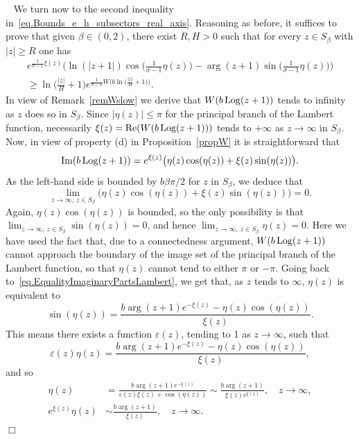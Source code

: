 \documentclass[12pt,leqno]{amsart}
\theoremstyle{plain}
\theoremstyle{definition}
\numberwithin{equation}{section}
\def\Log{\mathop{\rm Log}\nolimits}
\def\Re{\mathop{\rm Re}\nolimits}      %
\def\Im{\mathop{\rm Im}\nolimits}
\newenvironment{proof1}{\medskip\par\noindent{\bf Proof}\ \normalfont}{\hfill $\Box$
\medskip\par}
\begin{document}
\begin{proof1}
We turn now to the second inequality in~\eqref{eq.Bounds_e_h_subsectors_real_axis}. Reasoning as before, it suffices to prove that given $\beta\in(0,2)$, there exist $R,H>0$ such that for every $z\in S_{\beta}$ with $|z|\ge R$ one has
\begin{multline}\label{eq.IneqFineAdjustBelowComplexLambert}
e^{\frac{1}{\sigma-1}\xi(z)}\Big(\ln(|z+1|) \cos\big(\frac{1}{\sigma-1}\eta(z)\big)-
\arg(z+1)\sin\big(\frac{1}{\sigma-1}\eta(z)\big)\Big)\\
\ge
\ln\big(\frac{|z|}{H}+1\big) e^{\frac{1}{\sigma-1}W\big(b\ln\big(\frac{|z|}{H}+1\big)\big)}.
\end{multline}
In view of Remark~\ref{remWslow} we derive that $W(b\Log(z+1))$ tends to infinity as $z$ does so in $S_{\beta}$. Since $|\eta(z)|\le\pi$ for the principal branch of the Lambert function, necessarily $\xi(z)=\Re(W(b\Log(z+1)))$ tends to $+\infty$ as $z\to\infty$ in $S_{\beta}$. Now, in view of property (d) in Proposition~\ref{propW} it is straightforward that
\begin{equation}\label{eq.EqualityImaginaryPartsLambert}
\Im(b\Log(z+1))=e^{\xi(z)}\big(\eta(z)\cos(\eta(z))+ \xi(z)\sin(\eta(z))\big).
\end{equation}
As the left-hand side is bounded by $b\beta\pi/2$ for $z$ in $S_{\beta}$, we deduce that
$$
\lim_{z\to\infty,\ z\in S_{\beta}}\big(\eta(z)\cos(\eta(z))+\xi(z)\sin(\eta(z))\big)=0.
$$
Again, $\eta(z)\cos(\eta(z))$ is bounded, so the only possibility is that $\lim_{z\to\infty,\ z\in S_{\beta}}\sin(\eta(z))=0$, and hence $\lim_{z\to\infty,\ z\in S_{\beta}}\eta(z)=0$. Here we have used the fact that, due to a connectedness argument, $W(b\Log(z+1))$ cannot approach the boundary of the image set of the principal branch of the Lambert function, so that $\eta(z)$ cannot tend to either $\pi$ or $-\pi$. Going back to~\eqref{eq.EqualityImaginaryPartsLambert}, we get that, as $z$ tends to $\infty$, $\eta(z)$ is equivalent to
$$\sin(\eta(z))=\frac{b\arg(z+1)e^{-\xi(z)}-\eta(z)\cos(\eta(z))}{\xi(z)}.$$
This means there exists a function $\varepsilon(z)$, tending to 1 as $z\to\infty$, such that
$$
\varepsilon(z)\eta(z)= \frac{b\arg(z+1)e^{-\xi(z)}-\eta(z)\cos(\eta(z))}{\xi(z)},
$$
and so
\begin{align}\label{eq.AsymptoticsEtaz}
\eta(z)&= \frac{b\arg(z+1)e^{-\xi(z)}}{\varepsilon(z)\xi(z)+\cos(\eta(z))}
\sim  \frac{b\arg(z+1)}{\xi(z)e^{\xi(z)}},\quad z\to\infty,\\
e^{\xi(z)}\eta(z)&\sim \frac{b\arg(z+1)}{\xi(z)}, \quad z\to\infty.
\label{eq.AsymptoticsEtazExpEtaz}

\end{align}
\end{proof1}
\end{document}
